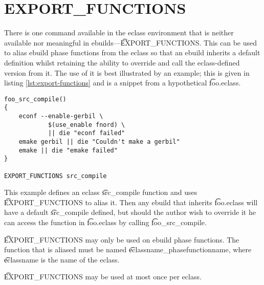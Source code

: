 \section{EXPORT\_FUNCTIONS}

There is one command available in the eclass environment that is neither available nor meaningful
in ebuilds---\t{EXPORT\_FUNCTIONS}. This can be used to alias ebuild phase functions from the
eclass so that an ebuild inherits a default definition whilst retaining the ability to override and
call the eclass-defined version from it. The use of it is best illustrated by an example; this is
given in listing \ref{lst:export-functions} and is a snippet from a hypothetical \t{foo.eclass}.

\begin{lstlisting}[float,caption=EXPORT\_FUNCTIONS example: foo.eclass,label=lst:export-functions]
foo_src_compile()
{
    econf --enable-gerbil \
            $(use_enable fnord) \
            || die "econf failed"
    emake gerbil || die "Couldn't make a gerbil"
    emake || die "emake failed"
}

EXPORT_FUNCTIONS src_compile
\end{lstlisting}

This example defines an eclass \t{src\_compile} function and uses \t{EXPORT\_FUNCTIONS} to alias
it. Then any ebuild that inherits \t{foo.eclass} will have a default \t{src\_compile} defined, but
should the author wish to override it he can access the function in \t{foo.eclass} by calling
\t{foo\_src\_compile}.

\t{EXPORT\_FUNCTIONS} may only be used on ebuild phase functions. The function that is aliased
must be named \t{eclassname\_phasefunctionname}, where \t{eclassname} is the name of the eclass.

\t{EXPORT\_FUNCTIONS} may be used at most once per eclass.

